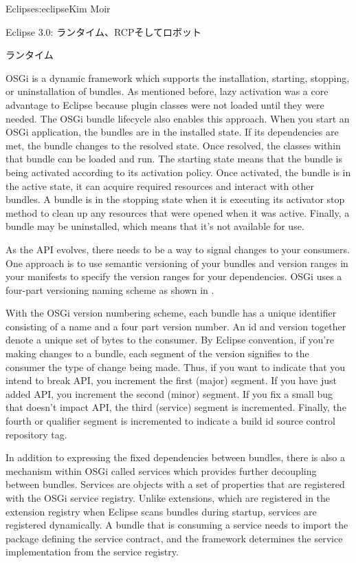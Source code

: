 \begin{aosachapter}{Eclipse}{s:eclipse}{Kim Moir}
\begin{aosasect1}{Eclipse 3.0: ランタイム、RCPそしてロボット}
\begin{aosasect2}{ランタイム}

OSGi is a dynamic framework which supports the installation, starting,
stopping, or uninstallation of bundles. As mentioned before, lazy
activation was a core advantage to Eclipse because plugin classes were
not loaded until they were needed. The OSGi bundle lifecycle also
enables this approach.  When you start an OSGi application, the
bundles are in the installed state. If its dependencies are met, the
bundle changes to the resolved state.  Once resolved, the classes
within that bundle can be loaded and run.  The starting state means
that the bundle is being activated according to its activation
policy. Once activated, the bundle is in the active state, it can
acquire required resources and interact with other bundles. A bundle
is in the stopping state when it is executing its activator stop method
to clean up any resources that were opened when it was active.
Finally, a bundle may be uninstalled, which means that it's not
available for use.

As the API evolves, there needs to be a way to signal changes to your
consumers. One approach is to use semantic versioning of your bundles
and version ranges in your manifests to specify the version ranges for
your dependencies.  OSGi uses a four-part versioning naming scheme as
shown in .


With the OSGi version numbering scheme, each bundle has a unique
identifier consisting of a name and a four part version number. An id
and version together denote a unique set of bytes to the
consumer. By Eclipse convention, if you're making changes to a bundle,
each segment of the version signifies to the consumer the type of
change being made. Thus, if you want to indicate that you intend to
break API, you increment the first (major) segment.  If you have just
added API, you increment the second (minor) segment. If you fix a
small bug that doesn't impact API, the third (service) segment is
incremented. Finally, the fourth or qualifier segment is incremented
to indicate a build id source control repository tag.

In addition to expressing the fixed dependencies between bundles,
there is also a mechanism within OSGi called services which provides
further decoupling between bundles. Services are objects with a set of
properties that are registered with the OSGi service registry. Unlike
extensions, which are registered in the extension registry when Eclipse
scans bundles during startup, services are registered
dynamically. A bundle that is consuming a service needs to import the
package defining the service contract, and the framework determines
the service implementation from the service registry.


\end{aosasect2}
\end{aosasect1}
\end{aosachapter}
